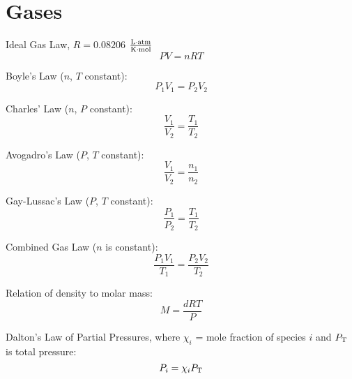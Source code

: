 \documentclass[10pt]{article}
\begin{document}

\section{Gases}


Ideal Gas Law, $R=0.08206$ $\frac{\textnormal{L$\cdot$atm}}{\textnormal{K$\cdot$mol}}$
\begin{equation*}
PV=nRT
\end{equation*}

Boyle's Law ($n$, $T$ constant):
\begin{equation*}
P_1V_1=P_2V_2
\end{equation*}

Charles' Law ($n$, $P$ constant):
\begin{equation*}
\frac{V_1}{V_2} = \frac{T_1}{T_2} 
\end{equation*}

Avogadro's Law ($P$, $T$ constant):
\begin{equation*}
\frac{V_1}{V_2} = \frac{n_1}{n_2} 
\end{equation*}

Gay-Lussac's Law ($P$, $T$ constant):
\begin{equation*}
\frac{P_1}{P_2} = \frac{T_1}{T_2} 
\end{equation*}

Combined Gas Law ($n$ is constant):
\begin{equation*}
\frac{P_1V_1}{T_1} = \frac{P_2V_2}{T_2}
\end{equation*}

Relation of density to molar mass:
\begin{equation*}
M = \frac{dRT}{P}
\end{equation*}

Dalton's Law of Partial Pressures, where $\chi_i$ = mole fraction of species $i$ and $P_\textnormal{T}$ is total pressure:
\begin{equation*}
P_i=\chi_iP_\textnormal{T}
\end{equation*} 
\end{document}
